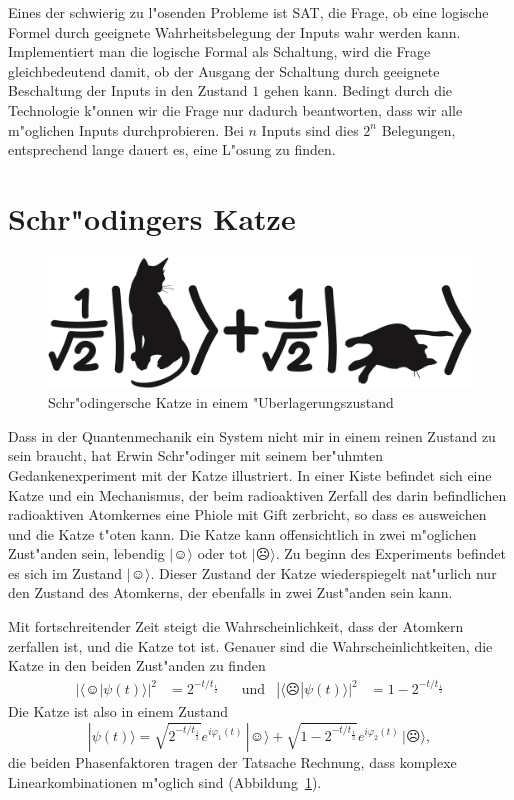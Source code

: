 Eines der schwierig zu l"osenden Probleme ist SAT, die Frage, ob eine
logische Formel durch geeignete Wahrheitsbelegung der Inputs wahr
werden kann. Implementiert man die logische Formal als Schaltung,
wird die Frage gleichbedeutend damit, ob der Ausgang der Schaltung
durch geeignete Beschaltung der Inputs in den Zustand $1$  gehen kann.
Bedingt durch die Technologie k"onnen wir die Frage nur dadurch beantworten,
dass wir alle m"oglichen Inputs durchprobieren. Bei $n$ Inputs sind
dies $2^n$ Belegungen, entsprechend lange dauert es, eine L"osung
zu finden.

\section{Schr"odingers Katze\label{section:cat}}
\begin{figure}
\centering
\includegraphics[width=0.5\hsize]{images/catliveanddead2.png}
\caption{Schr"odingersche Katze in einem "Uberlagerungszustand
\label{skript:deadandalive}}
\end{figure}
Dass in der Quantenmechanik ein System nicht mir in einem reinen Zustand
zu sein braucht, hat Erwin Schr"odinger mit seinem ber"uhmten 
Gedankenexperiment mit der Katze illustriert.
In einer Kiste befindet sich eine Katze und ein Mechanismus,
der beim radioaktiven Zerfall des darin befindlichen radioaktiven
Atomkernes eine Phiole mit Gift zerbricht, so dass es ausweichen und
die Katze t"oten kann.
Die Katze kann offensichtlich in zwei m"oglichen Zust"anden sein,
lebendig $|\smiley\rangle$ oder tot $|\frownie\rangle$. 
Zu beginn des Experiments befindet es sich im Zustand $|\smiley\rangle$.
Dieser Zustand der Katze wiederspiegelt nat"urlich nur den Zustand
des Atomkerns, der ebenfalls in zwei Zust"anden sein kann.

Mit fortschreitender Zeit steigt die Wahrscheinlichkeit, dass der
Atomkern zerfallen ist, und die Katze tot ist.
Genauer sind die Wahrscheinlichtkeiten, die Katze in den beiden
Zust"anden zu finden
\begin{align*}
|\langle \smiley|\psi(t)\rangle|^2
&=
2^{-t/t_{\frac12}}
&&\text{und}
&
|\langle \frownie|\psi(t)\rangle|^2
&=
1-2^{-t/t_{\frac12}}
\end{align*}
Die Katze ist also in einem Zustand
\[
|\psi(t)\rangle = 
\sqrt{2^{-t/t_{\frac12}}}e^{i\varphi_1(t)}\,|\smiley\rangle
+
\sqrt{1-2^{-t/t_{\frac12}}}e^{i\varphi_2(t)}\,|\frownie\rangle,
\]
die beiden Phasenfaktoren tragen der Tatsache Rechnung, dass komplexe
Linearkombinationen m"oglich sind (Abbildung~\ref{skript:deadandalive}).

